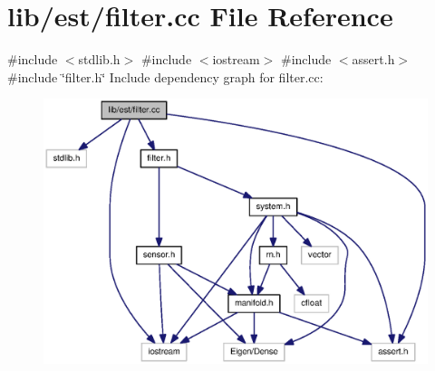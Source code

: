 \section{lib/est/filter.cc \-File \-Reference}
\label{filter_8cc}
{\ttfamily \#include $<$stdlib.\-h$>$}\*
{\ttfamily \#include $<$iostream$>$}\*
{\ttfamily \#include $<$assert.\-h$>$}\*
{\ttfamily \#include \char`\"{}filter.\-h\char`\"{}}\*
\-Include dependency graph for filter.\-cc\-:\nopagebreak
\begin{figure}[H]
\begin{center}
\leavevmode
\includegraphics[width=350pt]{filter_8cc__incl}
\end{center}
\end{figure}
